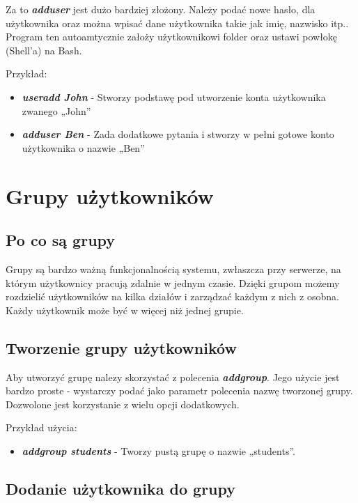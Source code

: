 \documentclass{article}
\begin{document}
Za to \emph{\textbf{adduser}} jest dużo bardziej złożony. Należy podać nowe hasło, dla użytkownika oraz można wpisać dane użytkownika takie jak imię, nazwisko itp.. Program ten autoamtycznie założy użytkownikowi folder oraz ustawi powłokę (Shell'a) na Bash.\par 
\newpage
Przykład:
\begin{itemize}
    \item \emph{\textbf{useradd John}} - Stworzy podstawę pod utworzenie konta użytkownika zwanego
    „John”
    \item \emph{\textbf{adduser Ben}} - Zada dodatkowe pytania i stworzy w pełni gotowe konto użytkownika o nazwie „Ben”
\end{itemize}

\section{Grupy użytkowników}

\subsection{Po co są grupy}
Grupy są bardzo ważną funkcjonalnością systemu, zwłaszcza przy serwerze, na którym użytkownicy pracują zdalnie w jednym czasie. Dzięki grupom możemy rozdzielić
użytkowników na kilka działów i zarządzać każdym z nich z osobna. Każdy użytkownik
może być w więcej niż jednej grupie. \par

\subsection{Tworzenie grupy użytkowników}

Aby utworzyć grupę nalezy skorzystać z polecenia \emph{\textbf{addgroup}}. Jego użycie jest bardzo
proste - wystarczy podać jako parametr polecenia nazwę tworzonej grupy. Dozwolone
jest korzystanie z wielu opcji dodatkowych.\par
Przykład użycia:
\begin{itemize}
    \item \emph{\textbf{addgroup students}} - Tworzy pustą grupę o nazwie „students”.
\end{itemize}

\subsection{Dodanie użytkownika do grupy}
\end{document}
